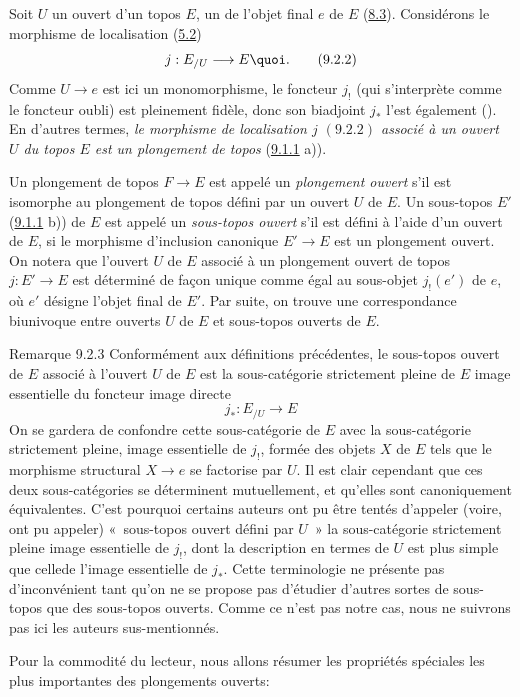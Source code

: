 \documentclass[10pt]{../fichiers-configuration-latex/smfart}
\begin{document}
Soit $U$ un ouvert d'un topos $E$, \ie un  de l'objet
final $e$ de $E$ (\hyperref[IV.def8.3]{8.3}). Considérons le morphisme de
localisation (\hyperref[IV.subsec5.2]{5.2})
\begin{equation*}
j:E_{/U}\longrightarrow E{\quoi}.\tag{9.2.2}
\end{equation*}
Comme $U\rightarrow e$ est ici un monomorphisme, le foncteur $j_{!}$
(qui s'interprète comme le foncteur oubli) est pleinement fidèle,
donc son biadjoint $j_\ast$ l'est également (). En d'autres
termes, \emph{le morphisme de localisation $j$ $(9.2.2)$ associé à
un ouvert $U$ du topos $E$ est un plongement de topos}
(\hyperref[IV.def9.1.1]{9.1.1} a)).

Un plongement de topos $F\rightarrow E$ est appelé un
\emph{plongement ouvert} s'il est isomorphe au plongement de topos
défini par un ouvert $U$ de $E$. Un sous-topos $E'$
(\hyperref[IV.def9.1.1]{9.1.1} b)) de $E$ est appelé un \emph{sous-topos ouvert}
s'il est défini à l'aide d'un ouvert de $E$, \ie si le morphisme
d'inclusion canonique $E'\rightarrow E$ est un plongement ouvert. On
notera que l'ouvert $U$ de $E$ associé à un plongement ouvert de
topos $j:E'\rightarrow E$ est déterminé de façon unique comme
égal au sous-objet $j_{!}(e')$ de $e$, où $e'$ désigne l'objet final
de $E'$. Par suite, on trouve une correspondance biunivoque entre
ouverts $U$ de $E$ et sous-topos ouverts de $E$.

\begin{enonce*}[remark]{Remarque 9.2.3}
Conformément aux définitions précédentes, le
sous-topos ouvert de
$E$ associé à l'ouvert $U$ de $E$ est la sous-catégorie strictement
pleine de $E$ image essentielle du foncteur image directe
$$
j_{\ast}:E_{/U}\longrightarrow E
$$
On se gardera de confondre cette sous-catégorie de $E$ avec la
sous-catégorie strictement pleine, image essentielle de $j_{!}$,
formée des objets $X$ de $E$ tels que le morphisme structural
$X\rightarrow e$ se factorise par $U$. Il est clair cependant que
ces deux sous-catégories se déterminent mutuellement, et qu'elles
sont canoniquement équivalentes. C'est pourquoi certains auteurs ont
pu être tentés d'appeler (voire, ont pu appeler) « sous-topos
ouvert défini par $U$ »  la sous-catégorie strictement pleine
image essentielle de $j_{!}$, dont la description en termes de $U$
est plus simple que celle\pageoriginale de l'image essentielle de
$j_{\ast}$. Cette terminologie ne présente pas d'inconvénient tant
qu'on ne se propose pas d'étudier d'autres sortes de sous-topos que
des sous-topos ouverts. Comme ce n'est pas notre cas, nous ne
suivrons pas ici les auteurs sus-mentionnés.

Pour la commodité du lecteur, nous allons résumer les propriétés
spéciales les plus importantes des plongements ouverts:
\end{enonce*}
\end{document}
